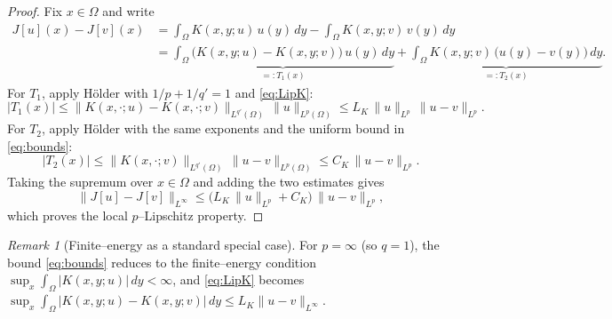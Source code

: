 \documentclass[11pt,a4paper]{article}
\theoremstyle{plain}
\theoremstyle{definition}
\theoremstyle{remark}
\newtheorem{remark}[theorem]{Remark}
\begin{document}
\begin{proof}
	Fix $x\in\Omega$ and write
	\[
		\begin{aligned}
			J[u](x)-J[v](x)
			 & =\int_\Omega K(x,y;u)\,u(y)\,dy-\int_\Omega K(x,y;v)\,v(y)\,dy            \\
			 & =\underbrace{\int_\Omega\big(K(x,y;u)-K(x,y;v)\big)\,u(y)\,dy}_{=:T_1(x)}
			+\underbrace{\int_\Omega K(x,y;v)\,\big(u(y)-v(y)\big)\,dy}_{=:T_2(x)}.
		\end{aligned}
	\]
	For $T_1$, apply Hölder with $1/p+1/q'=1$ and \eqref{eq:LipK}:
	\[
		|T_1(x)|
		\le \|K(x,\cdot;u)-K(x,\cdot;v)\|_{L^{q'}(\Omega)}\,\|u\|_{L^p(\Omega)}
		\le L_K\,\|u\|_{L^p}\,\|u-v\|_{L^p}.
	\]
	For $T_2$, apply Hölder with the same exponents and the uniform bound in
	\eqref{eq:bounds}:
	\[
		|T_2(x)|
		\le \|K(x,\cdot;v)\|_{L^{q'}(\Omega)}\,\|u-v\|_{L^p(\Omega)}
		\le C_K\,\|u-v\|_{L^p}.
	\]
	Taking the supremum over $x\in\Omega$ and adding the two estimates gives
	\[
		\|J[u]-J[v]\|_{L^\infty}
		\le \big(L_K\,\|u\|_{L^p}+C_K\big)\,\|u-v\|_{L^p},
	\]
	which proves the local $p$--Lipschitz property.
\end{proof}

\begin{remark}[Finite--energy as a standard special case]
	For $p=\infty$ (so $q=1$), the bound \eqref{eq:bounds} reduces to the
	finite--energy condition
	$\sup_{x}\int_\Omega |K(x,y;u)|\,dy<\infty$, and \eqref{eq:LipK} becomes
	$\sup_x\int_\Omega |K(x,y;u)-K(x,y;v)|\,dy\le L_K\|u-v\|_{L^\infty}$.
\end{remark}
\end{document}
